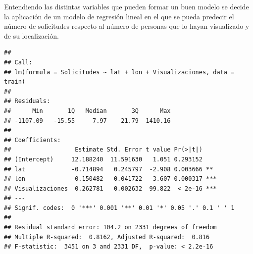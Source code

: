 \documentclass[
]{article}
\newenvironment{Shaded}{\begin{snugshade}}{\end{snugshade}}
\newcommand{\DataTypeTok}[1]{\textcolor[rgb]{0.87,0.87,0.75}{#1}}
\newcommand{\DecValTok}[1]{\textcolor[rgb]{0.86,0.86,0.80}{#1}}
\newcommand{\FloatTok}[1]{\textcolor[rgb]{0.75,0.75,0.82}{#1}}
\newcommand{\KeywordTok}[1]{\textcolor[rgb]{0.94,0.87,0.69}{#1}}
\newcommand{\NormalTok}[1]{\textcolor[rgb]{0.80,0.80,0.80}{#1}}
\newcommand{\OperatorTok}[1]{\textcolor[rgb]{0.94,0.94,0.82}{#1}}
\newcommand{\StringTok}[1]{\textcolor[rgb]{0.80,0.58,0.58}{#1}}
\begin{document}
Entendiendo las distintas variables que pueden formar un buen modelo se
decide la aplicación de un modelo de regresión lineal en el que se pueda
predecir el número de solicitudes respecto al número de personas que lo
hayan visualizado y de su localización.

\begin{Shaded}
\end{Shaded}

\begin{verbatim}
## 
## Call:
## lm(formula = Solicitudes ~ lat + lon + Visualizaciones, data = train)
## 
## Residuals:
##      Min       1Q   Median       3Q      Max 
## -1107.09   -15.55     7.97    21.79  1410.16 
## 
## Coefficients:
##                  Estimate Std. Error t value Pr(>|t|)    
## (Intercept)     12.188240  11.591630   1.051 0.293152    
## lat             -0.714894   0.245797  -2.908 0.003666 ** 
## lon             -0.150482   0.041722  -3.607 0.000317 ***
## Visualizaciones  0.262781   0.002632  99.822  < 2e-16 ***
## ---
## Signif. codes:  0 '***' 0.001 '**' 0.01 '*' 0.05 '.' 0.1 ' ' 1
## 
## Residual standard error: 104.2 on 2331 degrees of freedom
## Multiple R-squared:  0.8162, Adjusted R-squared:  0.816 
## F-statistic:  3451 on 3 and 2331 DF,  p-value: < 2.2e-16
\end{verbatim}
\end{document}
